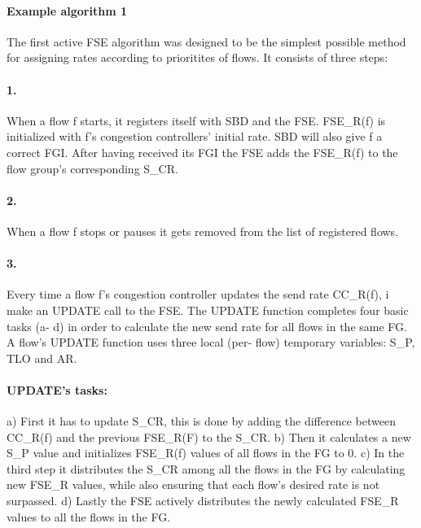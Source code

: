 \paragraph{Example algorithm 1}
The first active FSE algorithm was designed to be the simplest possible method for assigning rates according to prioritites of flows. 
It consists of three steps:
\paragraph{1.}
When a flow f starts, it registers itself with SBD and the FSE. 
FSE\_R(f) is initialized with f's congestion controllers' initial rate. 
SBD will also give f a correct FGI.
After having received its FGI the FSE adds the FSE\_R(f) to the flow group's corresponding S\_CR.
\paragraph{2.}
When a flow f stops or pauses it gets removed from the list of registered flows.
\paragraph{3.}
Every time a flow f's congestion controller updates the send rate CC\_R(f), i make an UPDATE call to the FSE.
The UPDATE function completes four basic tasks (a- d) in order to calculate the new send rate for all flows in the same FG.
A flow's UPDATE function uses three local (per- flow) temporary variables: S\_P, TLO and AR.
\paragraph{UPDATE's tasks:}
a) First it has to update S\_CR, this is done by adding the difference between CC\_R(f) and the previous FSE\_R(F) to the S\_CR.
b) Then it calculates a new S\_P value and initializes FSE\_R(f) values of all flows in the FG to 0.
c) In the third step it distributes the S\_CR among all the flows in the FG by calculating new FSE\_R values, while also ensuring that each flow's desired rate is not surpassed.
d) Lastly the FSE actively distributes the newly calculated FSE\_R values to all the flows in the FG.

